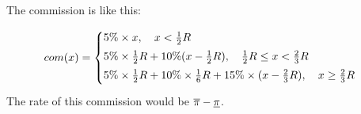 \documentclass{article}
\begin{document}
The commission is like this:

\begin{equation}
  com(x) = 
  \begin{cases}
    5\% \times x , \quad x < \frac12 \target \vspace{0.1cm}\\
    5\% \times \frac12 \target + 10\% (x- \frac12 \target), \quad \frac12 \target \le x < \frac23 \target \vspace{0.1cm} \\
    5\% \times \frac12 \target + 10\% \times \frac16 \target + 15 \% \times (x - \frac23 \target), \quad x \ge \frac23 \target \vspace{0.1cm}
  \end{cases}
\end{equation}
The rate of this commission would be $\overline{\pi} - \underline{\pi}$.








\end{document}
